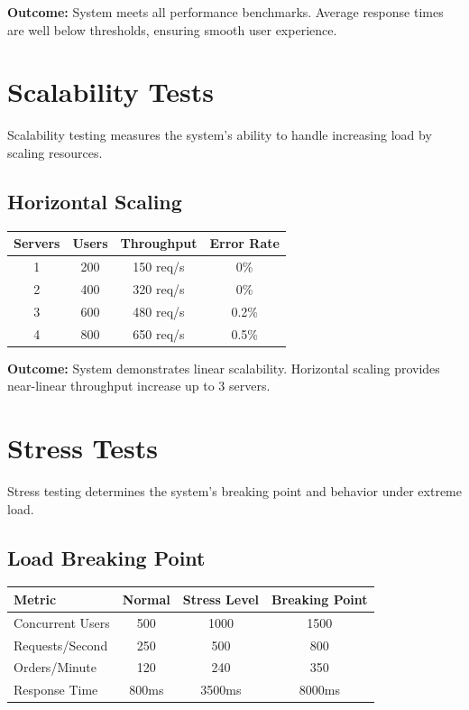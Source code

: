 \documentclass[12pt,a4paper]{report}
\begin{document}
\textbf{Outcome:} System meets all performance benchmarks. Average response times are well below thresholds, ensuring smooth user experience.

\section{Scalability Tests}
Scalability testing measures the system's ability to handle increasing load by scaling resources.

\subsection{Horizontal Scaling}

\begin{longtable}{|c|c|c|c|}
\hline
\textbf{Servers} & \textbf{Users} & \textbf{Throughput} & \textbf{Error Rate} \\
\hline
\endfirsthead
1 & 200 & 150 req/s & 0\% \\
\hline
2 & 400 & 320 req/s & 0\% \\
\hline
3 & 600 & 480 req/s & 0.2\% \\
\hline
4 & 800 & 650 req/s & 0.5\% \\
\hline
\end{longtable}

\textbf{Outcome:} System demonstrates linear scalability. Horizontal scaling provides near-linear throughput increase up to 3 servers.

\section{Stress Tests}
Stress testing determines the system's breaking point and behavior under extreme load.

\subsection{Load Breaking Point}

\begin{longtable}{|p{3cm}|c|c|c|}
\hline
\textbf{Metric} & \textbf{Normal} & \textbf{Stress Level} & \textbf{Breaking Point} \\
\hline
\endfirsthead
Concurrent Users & 500 & 1000 & 1500 \\
\hline
Requests/Second & 250 & 500 & 800 \\
\hline
Orders/Minute & 120 & 240 & 350 \\
\hline
Response Time & 800ms & 3500ms & 8000ms \\
\hline
\end{longtable}
\end{document}
